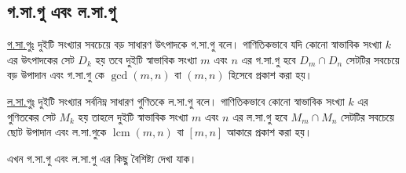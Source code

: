 \documentclass[a4paper,11pt]{article}
\DeclareMathOperator{\lcm}{lcm}
\begin{document}
\subsection{গ.সা.গু এবং ল.সা.গু}
\underline{গ.সা.গুঃ} দুইটি সংখ্যার সবচেয়ে বড় সাধারণ উৎপাদকে গ.সা.গু বলে। গাণিতিকভাবে যদি কোনো স্বাভাবিক সংখ্যা $k$ এর উৎপাদকের সেট $D_k$ হয় তবে দুইটি স্বাভাবিক সংখ্যা $m$ এবং $n$ এর গ.সা.গু হবে $D_m \cap D_n$ সেটটির সবচেয়ে বড় উপাদান এবং গ.সা.গু কে $\gcd(m,n) $ বা $(m,n)$ হিসেবে প্রকাশ করা হয়। 

\underline{ল.সা.গুঃ} দুইটি সংখ্যার সর্বনিম্ন সাধারণ গুণিতকে ল.সা.গু বলে। গাণিতিকভাবে কোনো স্বাভাবিক সংখ্যা $k$ এর গুণিতকের সেট $M_k$ হয় তাহলে দুইটি স্বাভাবিক সংখ্যা $m$ এবং $n$ এর ল.সা.গু হবে $M_m \cap M_n$ সেটটির সবচেয়ে ছোট উপাদান এবং ল.সা.গুকে $\lcm(m,n)$ বা $[m,n]$ আকারে প্রকাশ করা হয়। 

এখন গ.সা.গু এবং ল.সা.গু এর কিছু বৈশিষ্ট্য দেখা যাক। 
\end{document}
